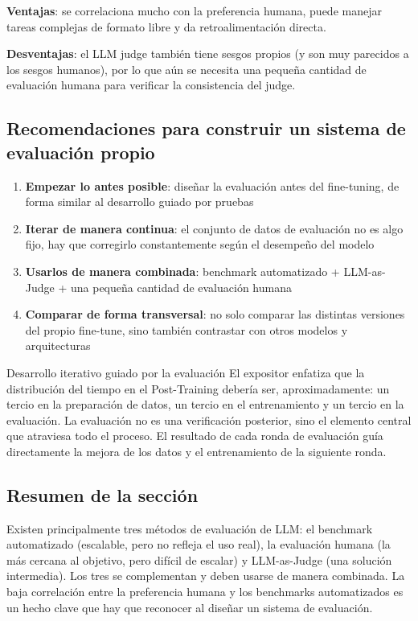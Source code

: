 \documentclass[a4paper]{article}
\begin{document}
\textbf{Ventajas}: se correlaciona mucho con la preferencia humana, puede manejar tareas complejas de formato libre y da retroalimentación directa.

\textbf{Desventajas}: el LLM judge también tiene sesgos propios (y son muy parecidos a los sesgos humanos), por lo que aún se necesita una pequeña cantidad de evaluación humana para verificar la consistencia del judge.

\subsection{Recomendaciones para construir un sistema de evaluación propio}

\begin{enumerate}
    \item \textbf{Empezar lo antes posible}: diseñar la evaluación antes del fine-tuning, de forma similar al desarrollo guiado por pruebas
    \item \textbf{Iterar de manera continua}: el conjunto de datos de evaluación no es algo fijo, hay que corregirlo constantemente según el desempeño del modelo
    \item \textbf{Usarlos de manera combinada}: benchmark automatizado + LLM-as-Judge + una pequeña cantidad de evaluación humana
    \item \textbf{Comparar de forma transversal}: no solo comparar las distintas versiones del propio fine-tune, sino también contrastar con otros modelos y arquitecturas
\end{enumerate}

\begin{knowledgebox}{Desarrollo iterativo guiado por la evaluación}
El expositor enfatiza que la distribución del tiempo en el Post-Training debería ser, aproximadamente: un tercio en la preparación de datos, un tercio en el entrenamiento y un tercio en la evaluación. La evaluación no es una verificación posterior, sino el elemento central que atraviesa todo el proceso. El resultado de cada ronda de evaluación guía directamente la mejora de los datos y el entrenamiento de la siguiente ronda.
\end{knowledgebox}

\subsection{Resumen de la sección}

Existen principalmente tres métodos de evaluación de LLM: el benchmark automatizado (escalable, pero no refleja el uso real), la evaluación humana (la más cercana al objetivo, pero difícil de escalar) y LLM-as-Judge (una solución intermedia). Los tres se complementan y deben usarse de manera combinada. La baja correlación entre la preferencia humana y los benchmarks automatizados es un hecho clave que hay que reconocer al diseñar un sistema de evaluación.
\end{document}
